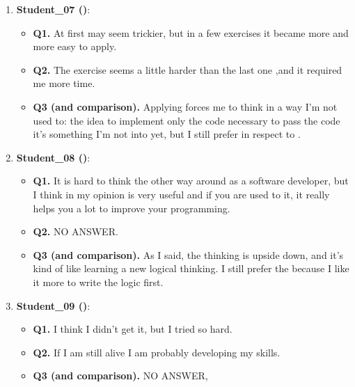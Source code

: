 \begin{enumerate}
    \item \textbf{Student\_07 (\tdd)}:
    \begin{itemize}
        \item \textbf{Q1.} At first \tdd may seem trickier, but in a few exercises it became more and more easy to apply.
        \item \textbf{Q2.} The exercise seems a little harder than the last one ,and it required me more time.
        \item \textbf{Q3 (\tdd and \notdd comparison).} Applying \tdd forces me to think in a way I'm not used to: the idea to implement only the code necessary to pass the code it's something I'm not into yet, but I still prefer \tdd in respect to \notdd.
    \end{itemize}

    \item \textbf{Student\_08 (\tdd)}:
    \begin{itemize}
        \item \textbf{Q1.} It is hard to think the other way around as a software developer, but I think in my opinion \tdd is very useful and if you are used to it, it really helps you a lot to improve your programming.
        \item \textbf{Q2.} NO ANSWER.
        \item \textbf{Q3 (\tdd and \notdd comparison).} As I said, the thinking is upside down, and it's kind of like learning a new logical thinking. I still prefer the \notdd because I like it more to write the logic first.
    \end{itemize}

    \item \textbf{Student\_09 (\tdd)}:
    \begin{itemize}
        \item \textbf{Q1.} I think I didn't get it, but I tried so hard.
        \item \textbf{Q2.} If I am still alive I am probably developing my skills.
        \item \textbf{Q3 (\tdd and \notdd comparison).} NO ANSWER,
    \end{itemize}
\end{enumerate}
